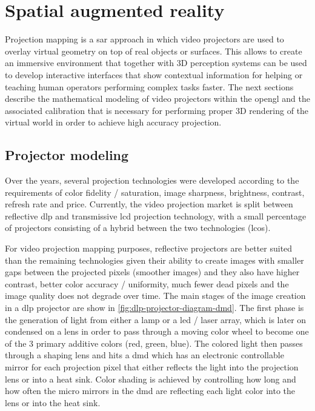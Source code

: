 \section{Spatial augmented reality}\label{sec:sar}

Projection mapping is a \gls{sar} \cite{Bimber2005} approach in which video projectors are used to overlay virtual geometry on top of real objects or surfaces. This allows to create an immersive environment that together with 3D perception systems can be used to develop interactive interfaces that show contextual information for helping or teaching human operators performing complex tasks faster. The next sections describe the mathematical modeling of video projectors within the \gls{opengl} and the associated calibration that is necessary for performing proper 3D rendering of the virtual world in order to achieve high accuracy projection.


\subsection{Projector modeling}

Over the years, several projection technologies were developed according to the requirements of color fidelity / saturation, image sharpness, brightness, contrast, refresh rate and price. Currently, the video projection market is split between reflective \gls{dlp} and transmissive \gls{lcd} projection technology, with a small percentage of projectors consisting of a hybrid between the two technologies (\gls{lcos}).

For video projection mapping purposes, reflective projectors are better suited than the remaining technologies given their ability to create images with smaller gaps between the projected pixels (smoother images) and they also have higher contrast, better color accuracy / uniformity, much fewer dead pixels and the image quality does not degrade over time. The main stages of the image creation in a \gls{dlp} projector are show in \cref{fig:dlp-projector-diagram-dmd}. The first phase is the generation of light from either a lamp or a \gls{led} / laser array, which is later on condensed on a lens in order to pass through a moving color wheel to become one of the 3 primary additive colors (red, green, blue). The colored light then passes through a shaping lens and hits a \gls{dmd} which has an electronic controllable mirror for each projection pixel that either reflects the light into the projection lens or into a heat sink. Color shading is achieved by controlling how long and how often the micro mirrors in the \gls{dmd} are reflecting each light color into the lens or into the heat sink.


